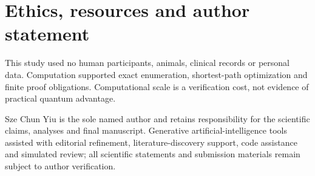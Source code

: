 \section*{Ethics, resources and author statement}

This study used no human participants, animals, clinical records or personal data.  Computation supported exact enumeration, shortest-path optimization and finite proof obligations.  Computational scale is a verification cost, not evidence of practical quantum advantage.

Sze Chun Yiu is the sole named author and retains responsibility for the scientific claims, analyses and final manuscript.  Generative artificial-intelligence tools assisted with editorial refinement, literature-discovery support, code assistance and simulated review; all scientific statements and submission materials remain subject to author verification.
